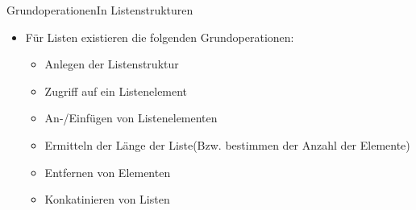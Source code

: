 \begin{frame}{Grundoperationen}{In Listenstrukturen}
	\begin{itemize}
		\item Für Listen existieren die folgenden Grundoperationen:
		\begin{itemize}
			\item Anlegen der Listenstruktur
			\item Zugriff auf ein Listenelement
			\item An-/Einfügen von Listenelementen
			\item Ermitteln der Länge der Liste(Bzw. bestimmen der Anzahl der Elemente)
			\item Entfernen von Elementen
			\item Konkatinieren von Listen
		\end{itemize}
	\end{itemize}
\end{frame}